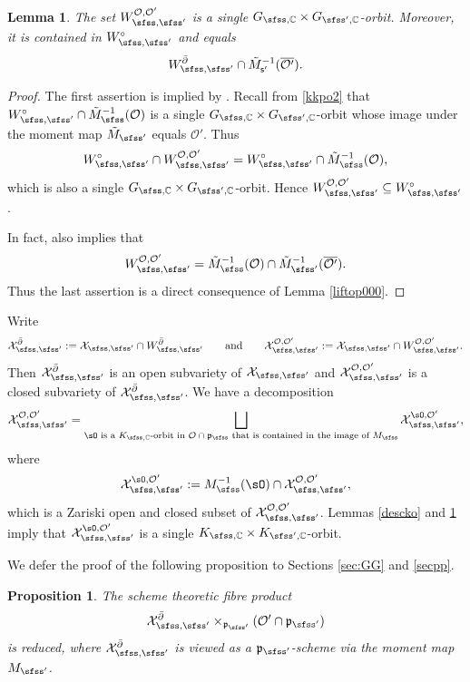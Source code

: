 \documentclass[11pt,a4paper]{amsart}
\newcommand{\CO}{{\mathcal {O}}}
\newcommand{\CX}{{\mathcal {X}}}
\newcommand{\p}{\mathfrak p}
\numberwithin{equation}{section}
\newtheorem{lem}[thm]{Lemma}
\newtheorem{prop}[thm]{Proposition}
\theoremstyle{remark}
\def\subset{\subseteq}
\begin{document}
\begin{lem}\label{liftop0}
The set $W_{\sfss, \sfss'}^{\CO, \CO'}$ is  a single $G_{\sfss, \C}\times G_{\sfss',\C}$-orbit. Moreover, it is  contained in $W_{\sfss,\sfss'}^\circ$ and equals
\[
   W_{\sfss, \sfss'}^{\bar \partial} \cap \tilde M_{\mathsf s'}^{-1}(\overline{\CO'}).
\]
\end{lem}
\begin{proof}
The first assertion is implied by \cite[Theorem 3.6]{DKPC}. Recall from \eqref{kkpo2} that $W_{\sfss,\sfss'}^\circ\cap \tilde M_{\sfss}^{-1}(\CO)$ is a single  $G_{\sfss, \C}\times G_{\sfss',\C}$-orbit  whose image under the moment map $\tilde M_{\sfss'}$ equals $\CO'$. Thus
\[
W_{\sfss,\sfss'}^\circ\cap W_{\sfss, \sfss'}^{\CO, \CO'}=W_{\sfss,\sfss'}^\circ\cap \tilde M_{\sfss}^{-1}(\CO),
\]
which  is also a   single  $G_{\sfss, \C}\times G_{\sfss',\C}$-orbit. Hence $W_{\sfss, \sfss'}^{\CO, \CO'}\subset W_{\sfss,\sfss'}^\circ$.

In fact, \cite[Theorem 3.6]{DKPC} also implies that
\[
W_{\sfss, \sfss'}^{\CO, \CO'}=\tilde M_{\sfss}^{-1}(\CO)\cap  \tilde M_{\sfss'}^{-1}(\overline{\CO'}).
\]
Thus the last assertion is a direct consequence of Lemma \ref{liftop000}.
\end{proof}



Write
\[
    \CX_{\sfss, \sfss'}^{\bar \partial}:=\CX_{\sfss, \sfss'} \cap W_{\sfss, \sfss'}^{\bar \partial}\qquad\textrm{and}\qquad \CX_{\sfss, \sfss'}^{\CO, \CO'}:=\CX_{\sfss, \sfss'} \cap W_{\sfss, \sfss'}^{\CO, \CO'}.
   \]
Then  $ \CX_{\sfss, \sfss'}^{\bar \partial}$ is an open subvariety of $ \CX_{\sfss, \sfss'}$ and  $\CX_{\sfss, \sfss'}^{\CO, \CO'}$ is a  closed subvariety of  $\CX_{\sfss, \sfss'}^{\bar \partial}$. We have a decomposition
 \[
   \CX_{\sfss, \sfss'}^{\CO, \CO'}=\bigsqcup_{\sO\textrm{ is a   $K_{\sfss, \C}$-orbit in $ \CO\cap \p_\sfss$ that is contained in the image of $M_\sfss$}}  \CX_{\sfss, \sfss'}^{\sO, \CO'},
 \]
 where
 \[
   \CX_{\sfss, \sfss'}^{\sO, \CO'}:=M_\sfss^{-1}(\sO)\cap \CX_{\sfss, \sfss'}^{\CO, \CO'},
 \]
 which is a Zariski open and closed subset of $\CX_{\sfss, \sfss'}^{\CO, \CO'}$. Lemmas \ref{descko} and \ref{liftop0} imply that $ \CX_{\sfss, \sfss'}^{\sO, \CO'}$ is a single $K_{\sfss, \C}\times K_{\sfss',\C}$-orbit.

\medskip

We defer the proof of the following proposition to Sections \ref{sec:GG} and \ref{secpp}.
\begin{prop}\label{propreduced}
 The scheme theoretic  fibre product
\[
\CX_{\sfss, \sfss'}^{\bar \partial}\times_{\p_{\sfss'}} ({\CO'}\cap \p_{\sfss'})
\]
is reduced, where $\CX_{\sfss, \sfss'}^{\bar \partial}$ is viewed as a $\p_{\sfss'}$-scheme via the moment map $M_{\sfss'}$.
\end{prop}
\end{document}
